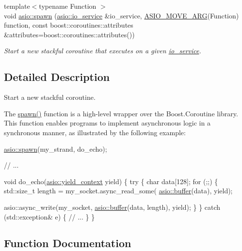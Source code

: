 \begin{DoxyCompactItemize}
{\footnotesize template$<$typename Function $>$ }\\void \hyperlink{group__spawn_gab669a6a11388d45fb48bc9be9e5bda38}{asio\+::spawn} (\hyperlink{classasio_1_1io__service}{asio\+::io\+\_\+service} \&io\+\_\+service, \hyperlink{config_8hpp_a4a0e0a3e374fd7362ab5590338533950}{A\+S\+I\+O\+\_\+\+M\+O\+V\+E\+\_\+\+A\+R\+G}(Function) function, const boost\+::coroutines\+::attributes \&attributes=boost\+::coroutines\+::attributes())
\begin{DoxyCompactList}\small\item\em Start a new stackful coroutine that executes on a given \hyperlink{classasio_1_1io__service}{io\+\_\+service}. \end{DoxyCompactList}\end{DoxyCompactItemize}


\subsection{Detailed Description}
Start a new stackful coroutine. 

The \hyperlink{group__spawn_ga4f2228347a699338928b72b60b52e345}{spawn()} function is a high-\/level wrapper over the Boost.\+Coroutine library. This function enables programs to implement asynchronous logic in a synchronous manner, as illustrated by the following example\+:


\begin{DoxyCode}
 \hyperlink{group__spawn_ga4f2228347a699338928b72b60b52e345}{asio::spawn}(my\_strand, do\_echo);

\textcolor{comment}{// ...}

\textcolor{keywordtype}{void} do\_echo(\hyperlink{classasio_1_1basic__yield__context}{asio::yield\_context} yield)
\{
  \textcolor{keywordflow}{try}
  \{
    \textcolor{keywordtype}{char} data[128];
    \textcolor{keywordflow}{for} (;;)
    \{
      std::size\_t length =
        my\_socket.async\_read\_some(
          \hyperlink{group__buffer_ga1ed66e401559cbfd19595392f653b47c}{asio::buffer}(data), yield);

      asio::async\_write(my\_socket,
          \hyperlink{group__buffer_ga1ed66e401559cbfd19595392f653b47c}{asio::buffer}(data, length), yield);
    \}
  \}
  \textcolor{keywordflow}{catch} (std::exception& e)
  \{
    \textcolor{comment}{// ...}
  \}
\} 
\end{DoxyCode}
 

\subsection{Function Documentation}
\hypertarget{group__spawn_ga4f2228347a699338928b72b60b52e345}{}
